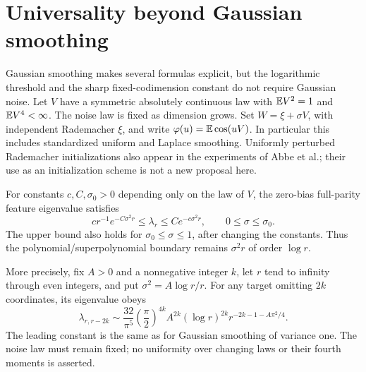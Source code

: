 \section{Universality beyond Gaussian smoothing}
Gaussian smoothing makes several formulas explicit, but the logarithmic
threshold and the sharp fixed-codimension constant do not require Gaussian
noise. Let $V$ have a symmetric absolutely continuous law with
$\mathbb E V^2=1$ and $\mathbb E V^4<\infty$. The noise law is fixed as dimension
grows. Set $W=\xi+\sigma V$, with independent Rademacher $\xi$, and
write $\varphi(u)=\mathbb E\cos(uV)$. In particular this includes standardized
uniform and Laplace smoothing. Uniformly perturbed Rademacher
initializations also appear in the experiments of Abbe et al.; their use
as an initialization scheme is not a new proposal here.

\begin{theorem}
For constants $c,C,\sigma_0>0$ depending only on the law of $V$, the
zero-bias full-parity feature eigenvalue satisfies
\[
 c r^{-1}e^{-C\sigma^2r}\le\lambda_r
       \le C e^{-c\sigma^2r},\qquad 0\le\sigma\le\sigma_0.
 \tag{30}
\]
The upper bound also holds for $\sigma_0\le\sigma\le1$, after changing
the constants. Thus the polynomial/superpolynomial boundary remains
$\sigma^2r$ of order $\log r$.

More precisely, fix $A>0$ and a nonnegative integer $k$, let $r$ tend
to infinity through even integers, and put $\sigma^2=A\log r/r$.
For any target omitting $2k$ coordinates, its eigenvalue obeys
\[
 \lambda_{r,r-2k}\sim
 \frac{32}{\pi^5}\left(\frac\pi2\right)^{4k}A^{2k}
 (\log r)^{2k}r^{-2k-1-A\pi^2/4}.                    \tag{31}
\]
The leading constant is the same as for Gaussian smoothing of variance
one. The noise law must remain fixed; no uniformity over changing laws
or their fourth moments is asserted.
\end{theorem}
